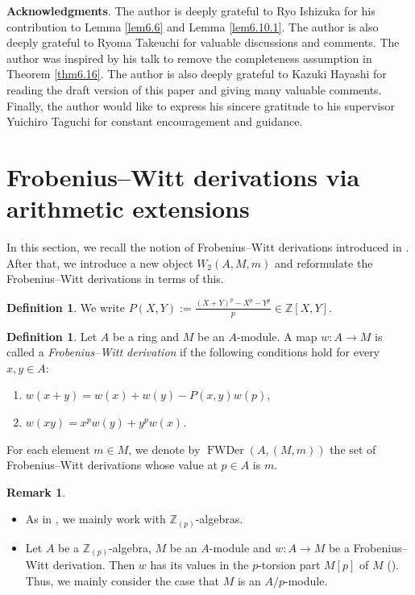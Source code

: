 \documentclass[11pt, a4paper]{amsart}
\theoremstyle{plain}
\theoremstyle{definition}
\newtheorem{definition}[theorem]{Definition}
\newtheorem{remark}[theorem]{Remark}
\begin{document}
\vspace{2mm}
\textbf{Acknowledgments}. 
The author is deeply grateful to Ryo Ishizuka for his contribution to Lemma \ref{lem6.6} and Lemma \ref{lem6.10.1}. The author is also deeply grateful to Ryoma Takeuchi for valuable discussions and comments. The author was inspired by his talk to remove the completeness assumption in Theorem \ref{thm6.16}. The author is also deeply grateful to Kazuki Hayashi for reading the draft version of this paper and giving many valuable comments. Finally, the author would like to express his sincere gratitude to his supervisor Yuichiro Taguchi for constant encouragement and guidance.

\section{Frobenius--Witt derivations via arithmetic extensions}
In this section, we recall the notion of Frobenius--Witt derivations introduced in \cite{Sai22}. After that, we introduce a new object $W_2(A,M,m)$ and reformulate the Frobenius--Witt derivations in terms of this.

\begin{definition}\label{def2.1}
    We write $P(X,Y):=\frac{(X+Y)^p-X^p-Y^p}{p}\in \mathbb Z[X,Y]$.
\end{definition}
\begin{definition}\label{def2.2}
    Let $A$ be a ring and $M$ be an $A$-module. A map $w:A\to M$ is called a {\em Frobenius--Witt derivation} if the following conditions hold for every $x,y\in A$:\begin{enumerate}
        \item $w(x+y)=w(x)+w(y)-P(x,y)w(p)$,
        \item $w(xy)=x^pw(y)+y^pw(x)$.
    \end{enumerate}
    For each element $m\in M$, we denote by $\operatorname{FWDer}(A,(M,m))$ the set of Frobenius--Witt derivations whose value at $p\in A$ is $m$. 
\end{definition}

\begin{remark}\label{rem2.3}
    \begin{itemize}
        \item As in \cite{Sai22}, we mainly work with $\mathbb Z_{(p)}$-algebras.
        \item Let $A$ be a $\mathbb Z_{(p)}$-algebra, $M$ be an $A$-module and $w:A\to M$ be a Frobenius--Witt derivation. Then $w$ has its values in the $p$-torsion part $M[p]$ of $M$ (\cite[Lemma 1.2]{Sai22}). Thus, we mainly consider the case that $M$ is an $A/p$-module.
    \end{itemize}
\end{remark}
\end{document}
